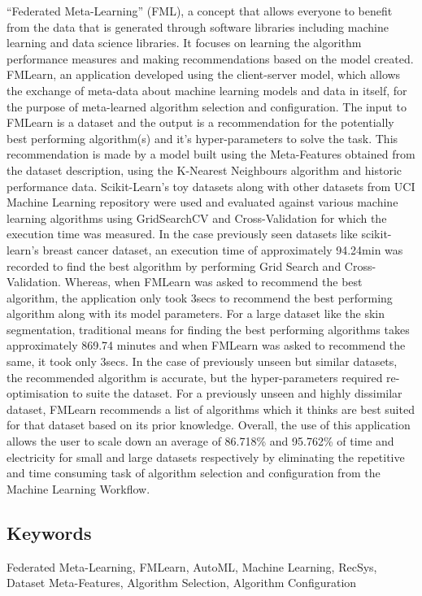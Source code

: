 \quad\quad “Federated Meta-Learning” (FML), a concept that allows everyone to benefit from the data that is generated through software libraries including machine learning and data science libraries. It focuses on learning the algorithm performance measures and making recommendations based on the model created. FMLearn, an application developed using the client-server model, which allows the exchange of meta-data about machine learning models and data in itself, for the purpose of meta-learned algorithm selection and configuration. 
The input to FMLearn is a dataset and the output is a recommendation for the potentially best performing algorithm(s) and it’s hyper-parameters to solve the task. This recommendation is made by a model built using the Meta-Features obtained from the dataset description, using the K-Nearest Neighbours algorithm and historic performance data.
Scikit-Learn’s toy datasets along with other datasets from UCI Machine Learning repository were used and evaluated against various machine learning algorithms using GridSearchCV and Cross-Validation for which the execution time was measured.
In the case previously seen datasets like scikit-learn’s breast cancer dataset, an execution time of approximately 94.24min was recorded to find the best algorithm by performing Grid Search and Cross-Validation. Whereas, when FMLearn was asked to recommend the best algorithm, the application only took 3secs to recommend the best performing algorithm along with its model parameters.
For a large dataset like the skin segmentation, traditional means for finding the best performing algorithms takes approximately 869.74 minutes and when FMLearn was asked to recommend the same, it took only 3secs.
In the case of previously unseen but similar datasets, the recommended algorithm is accurate, but the hyper-parameters required re-optimisation to suite the dataset. For a previously unseen and highly dissimilar dataset, FMLearn recommends a list of algorithms which it thinks are best suited for that dataset based on its prior knowledge.
Overall, the use of this application allows the user to scale down an average of 86.718\% and 95.762\% of time and electricity for small and large datasets respectively by eliminating the repetitive and time consuming task of algorithm selection and configuration from the Machine Learning Workflow. 

\subsection*{Keywords}
{Federated Meta-Learning, FMLearn, AutoML, Machine Learning, RecSys, Dataset Meta-Features, Algorithm Selection, Algorithm Configuration}


